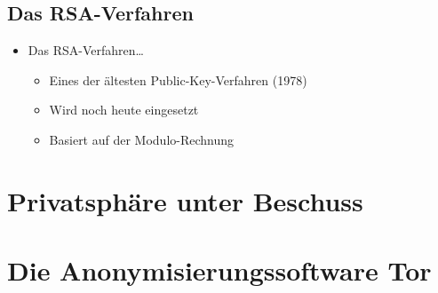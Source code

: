 \documentclass{beamer}
\begin{document}
\subsection{Das RSA-Verfahren}

\begin{frame}
\begin{itemize}
	\item Das RSA-Verfahren\dots
	\begin{itemize}
		\item Eines der ältesten Public-Key-Verfahren (1978)
		\item Wird noch heute eingesetzt
		\item Basiert auf der Modulo-Rechnung
	\end{itemize}
\end{itemize}
\end{frame}

\section{Privatsphäre unter Beschuss}

\begin{frame}
\end{frame}

\section{Die Anonymisierungssoftware Tor}

\begin{frame}
\end{frame}
\end{document}
